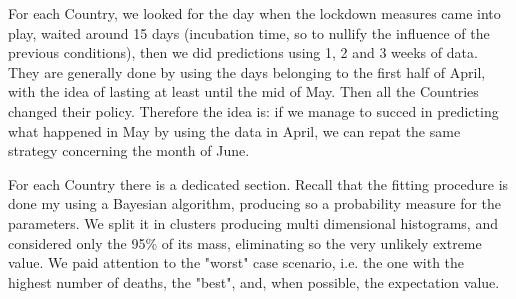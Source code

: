 \documentclass[8pt]{article}
\begin{document}
For each Country, we looked for the day when the lockdown measures
came into play, waited around 15 days (incubation time, so to nullify
the influence of the previous conditions), then we did predictions 
using 1, 2 and 3 weeks of data. They are generally done by using 
the days belonging to the first half of April, with the idea of lasting
at least until the mid of May. Then all the Countries changed their
policy. Therefore the idea is: if we manage to succed in predicting
what happened in May by using the data in April, we can repat the same
strategy concerning the month of June. 


For each Country there is a dedicated section.
Recall that the fitting procedure is done my using a Bayesian algorithm,
producing so a probability measure for the parameters. We split it in
clusters producing multi dimensional histograms, and considered
only the 95\% of its mass, eliminating so the very
unlikely extreme value. We paid attention to
the "worst" case scenario, i.e. the one with the highest number of deaths, 
the "best", and, when possible, the expectation value.
\end{document}
